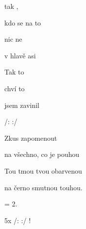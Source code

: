 

\zs
{} tak ,

kdo se  na to 

nic  ne

v hlavě  asi 
\ks

\zr
Tak   to 

 chví  to 

 jsem  zavinil  

/:     :/
\kr

\zs
Zkus zapomenout

na všechno, co je pouhou

Tou tmou tvou obarvenou

na černo smutnou touhou.
\ks

\zr  \kr

\zs
= 2.
\ks

\zr  \kr

5x /:     :/ !

\kp





